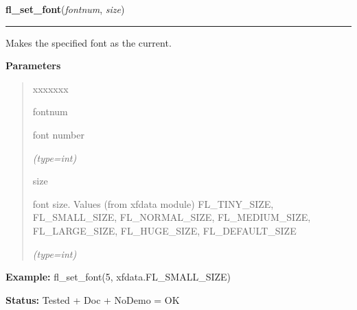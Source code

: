     \label{xformslib:flbasic:fl_set_font}

    \vspace{0.5ex}

\hspace{.8\funcindent}\begin{boxedminipage}{\funcwidth}

    \raggedright \textbf{fl\_set\_font}(\textit{fontnum}, \textit{size})

    \vspace{-1.5ex}

    \rule{\textwidth}{0.5\fboxrule}
\setlength{\parskip}{2ex}
    Makes the specified font as the current.

\setlength{\parskip}{1ex}
      \textbf{Parameters}
      \vspace{-1ex}

      \begin{quote}
        \begin{Ventry}{xxxxxxx}

          \item[fontnum]

          font number

            {\it (type=int)}

          \item[size]

          font size. Values (from xfdata module) FL\_TINY\_SIZE, 
          FL\_SMALL\_SIZE, FL\_NORMAL\_SIZE, FL\_MEDIUM\_SIZE, 
          FL\_LARGE\_SIZE, FL\_HUGE\_SIZE, FL\_DEFAULT\_SIZE

            {\it (type=int)}

        \end{Ventry}

      \end{quote}

\textbf{Example:} fl\_set\_font(5, xfdata.FL\_SMALL\_SIZE)



\textbf{Status:} Tested + Doc + NoDemo = OK



    \end{boxedminipage}

    \label{xformslib:flbasic:fl_get_char_height}

